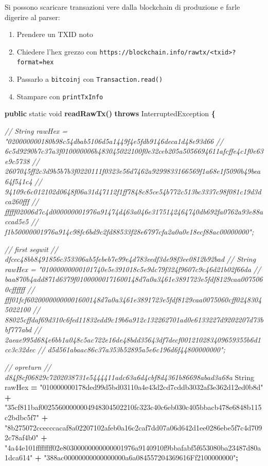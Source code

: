 \documentclass[
  italian,
  openany]{book}
\newenvironment{Shaded}{\begin{snugshade}}{\end{snugshade}}
\newcommand{\BuiltInTok}[1]{#1}
\newcommand{\CommentTok}[1]{\textcolor[rgb]{0.56,0.35,0.01}{\textit{#1}}}
\newcommand{\DataTypeTok}[1]{\textcolor[rgb]{0.13,0.29,0.53}{#1}}
\newcommand{\FunctionTok}[1]{\textcolor[rgb]{0.13,0.29,0.53}{\textbf{#1}}}
\newcommand{\KeywordTok}[1]{\textcolor[rgb]{0.13,0.29,0.53}{\textbf{#1}}}
\newcommand{\NormalTok}[1]{#1}
\newcommand{\OperatorTok}[1]{\textcolor[rgb]{0.81,0.36,0.00}{\textbf{#1}}}
\newcommand{\StringTok}[1]{\textcolor[rgb]{0.31,0.60,0.02}{#1}}
\providecommand{\tightlist}{%
  \setlength{\itemsep}{0pt}\setlength{\parskip}{0pt}}
\begin{document}
Si possono scaricare transazioni vere dalla blockchain di produzione e
farle digerire al parser:

\begin{enumerate}
\def\labelenumi{\arabic{enumi}.}
\tightlist
\item
  Prendere un TXID noto
\item
  Chiedere l'hex grezzo con
  \texttt{https://blockchain.info/rawtx/\textless{}txid\textgreater{}?format=hex}
\item
  Passarlo a \texttt{bitcoinj} con \texttt{Transaction.read()}
\item
  Stampare con \texttt{printTxInfo}
\end{enumerate}

\begin{Shaded}
\begin{Highlighting}[]
\KeywordTok{public} \DataTypeTok{static} \DataTypeTok{void} \FunctionTok{readRawTx}\OperatorTok{()} \KeywordTok{throws} \BuiltInTok{InterruptedException} \OperatorTok{\{}

    \CommentTok{// String rawHex = "020000000180b98c54dbab5106d5a1449f4e5fdb9146deca1d48e93d66}
    \CommentTok{// 6c5d9290b7c37a3f010000006b483045022100f0e32ceb205a5056694611afcffe4c1f0e63e9c5738}
    \CommentTok{// 2607045ff2c3d9b5b7b3f0220111f0323e56d7462a9299833166569f1a68e1f5090b49bea64f541c4}
    \CommentTok{// 94109c6c012102d0648f06a31d47112f1ff7848c85ce54b772c513bc3337c98f081c19d3dca260fff}
    \CommentTok{// fffff02006d7c4d000000001976a91474d463a046e3175142464740db692fa0762a93e88accad5e5}
    \CommentTok{// f1b50000001976a914c98fc6bd9c2fd88533f28e6797cfa2a0a0e18ecf88ac00000000";}

    \CommentTok{// first segwit}
    \CommentTok{// dfcec48bb8491856c353306ab5febeb7e99e4d783eedf3de98f3ee0812b92bad}
    \CommentTok{// String rawHex = "01000000000101740e5e391018c5e9dc79f324f9607c9c46d21b02f66da}
    \CommentTok{// baa870b4add871d6379f01000000171600148d7a0a3461e3891723e5fdf8129caa0075060cffffff}
    \CommentTok{// fff01fcf60200000000001600148d7a0a3461e3891723e5fdf8129caa0075060cff02483045022100}
    \CommentTok{// 88025cffdaf69d310c6fed11832edd9c19b6a912c132262701ad0e6133227d9202207d73bbf777abd}
    \CommentTok{// 2aeae995d684e6bb1a048c5ac722e16de48bdd35643df7decf001210283409659355b6d1cc3c32dec}
    \CommentTok{// d5d561abaac86c37a353b52895a5e6c196d6f44800000000";}

    \CommentTok{// opreturn}
    \CommentTok{// d84f8cf06829c7202038731e5444411adc63a6d4cbf8d4361b86698abad3a68a}
    \BuiltInTok{String}\NormalTok{ rawHex }\OperatorTok{=} \StringTok{"010000000178ded99d5bd03110a4e43d2cd7cddb3032af3e362d12ed0b8d"}
        \OperatorTok{+} \StringTok{"35cf811baf00255600000004948304502210fc323c40c6eb030c405bbacb478e6848b115c2bdbc5f7"}
        \OperatorTok{+} \StringTok{"8b275072ccecccacaf8a02207102afeb0a16c2caf7dd07a06d642d1ee0286ebe5f7c4d7092c78af4b0"}
        \OperatorTok{+} \StringTok{"4a44e101ffffffff02e80300000000000001976a9140910f9bbafabf5f653080ba23487d80a1dca614"}
        \OperatorTok{+} \StringTok{"388ac00000000000000000a6a084557204369616Ff2100000000"}\OperatorTok{;}


\end{Highlighting}
\end{Shaded}
\end{document}
